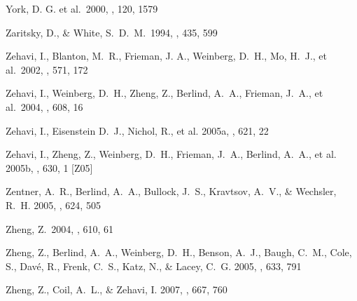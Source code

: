 \documentclass[]{emulateapj}
\begin{document}
\begin{thebibliography}{999}
York, D. G. et al.\ 2000, \aj, 120, 1579

Zaritsky, D., \& White, S.~D.~M.\ 1994, \apj, 435, 599 

Zehavi, I., Blanton, M.\ R., Frieman, J. A., Weinberg, D.\ H., Mo, H.\ J., 
et al.\ 2002, \apj, 571, 172

Zehavi, I., Weinberg, D.\ H., Zheng, Z., Berlind, A.\ A., Frieman, J.\ A.,
et al.\ 2004, \apj, 608, 16

Zehavi, I., Eisenstein D.\ J., Nichol, R., et al. 2005a,
\apj, 621, 22

Zehavi, I., Zheng, Z.,  Weinberg, D.\ H., Frieman, J.\ A., Berlind, A.\ A., 
et al. 2005b,
\apj, 630, 1 [Z05]

Zentner, A.\ R., Berlind, A.\ A., Bullock, J.\ S., Kravtsov, A.\ V., \&
Wechsler, R.\ H. 2005,
\apj, 624, 505 %


Zheng, Z.\ 2004, \apj, 610, 61

Zheng, Z., Berlind, A.\ A., Weinberg, D.\ H., Benson, A.\ J., 
Baugh, C.\ M., Cole, S., Dav\'e, R., Frenk, C.\ S., Katz, N., \& Lacey, C.\ G.
2005, 
\apj, 633, 791 %

Zheng, Z., Coil, A.\ L., \& Zehavi, I. 2007, 
\apj, 667, 760 %


\end{thebibliography}
\end{document}
